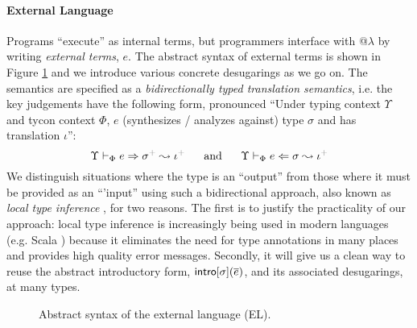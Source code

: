 \documentclass[pldi]{sigplanconf-pldi15}
\newcommand{\moutput}{^{\color{gray}+}}
\begin{document}
\paragraph{External Language} Programs ``execute'' as internal terms, but programmers interface with @$\lambda$ by writing \emph{external terms}, $e$. The abstract syntax of external terms is shown in Figure \ref{syntax-EL} and we introduce various concrete desugarings as we go on. %
The semantics are specified as a \emph{bidirectionally typed translation semantics}, i.e. the key judgements have the following form, pronounced ``Under typing context $\Upsilon$ and tycon context $\Phi$, $e$ (synthesizes / analyzes against) type $\sigma$ and has  translation $\iota$'':\[\esynX{e}{\st\moutput}{\iota\moutput} ~~~~~\text{and}~~~~~ \eanaX{e}{\st}{\iota\moutput}\]
\noindent
We distinguish situations where the type is an ``output'' from those where it must be provided as an ``'input'' using such a bidirectional approach, also known as \emph{local type inference} \cite{Pierce:2000:LTI:345099.345100}, for two reasons. The first is to justify the practicality of our approach: local type inference is increasingly being used in modern languages (e.g. Scala \cite{OdeZenZen01}) because it eliminates the need for type annotations in many places and provides high quality error messages. %
Secondly, it will  give us a clean way to reuse the abstract introductory form, ${\sf intro}[\sigma](\overline{e})$, and its associated desugarings, at many types.%



\begin{figure}[t]
\small
\hspace{-5px}
\caption{Abstract syntax of the external language (EL).}
\label{syntax-EL}\vspace{-10px}
\end{figure}
\end{document}
